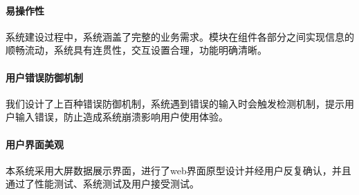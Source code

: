 \paragraph{易操作性}
系统建设过程中，系统涵盖了完整的业务需求。模块在组件各部分之间实现信息的顺畅流动，系统具有连贯性，交互设置合理，功能明确清晰。
\paragraph{用户错误防御机制}
我们设计了上百种错误防御机制，系统遇到错误的输入时会触发检测机制，提示用户输入错误，防止造成系统崩溃影响用户使用体验。
\paragraph{用户界面美观}
本系统采用大屏数据展示界面，进行了web界面原型设计并经用户反复确认，并且通过了性能测试、系统测试及用户接受测试。
